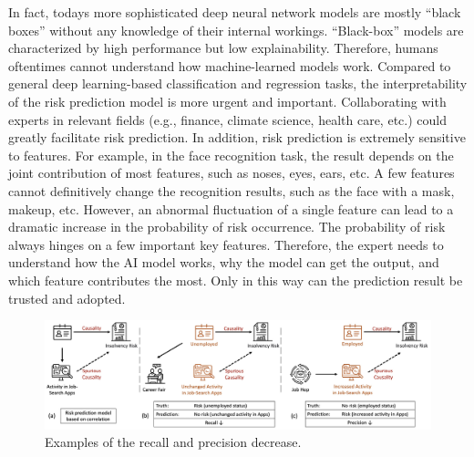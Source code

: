\documentclass[letterpaper]{article} %
\theoremstyle{definition}
\theoremstyle{remark}
\begin{document}
In fact, todays more sophisticated deep neural network models are mostly ``black boxes'' without any knowledge of their internal workings. ``Black-box'' models are characterized by high performance but low explainability. Therefore, humans oftentimes cannot understand how machine-learned models work. Compared to general deep learning-based classification and regression tasks, the interpretability of the risk prediction model is more urgent and important. Collaborating with experts in relevant fields (e.g., finance, climate science, health care, etc.) could greatly facilitate risk prediction. In addition, risk prediction is extremely sensitive to features. For example, in the face recognition task, the result depends on the joint contribution of most features, such as noses, eyes, ears, etc. A few features cannot definitively change the recognition results, such as the face with a mask, makeup, etc. However, an abnormal fluctuation of a single feature can lead to a dramatic increase in the probability of risk occurrence. The probability of risk always hinges on a few important key features. Therefore, the expert needs to understand how the AI model works, why the model can get the output, and which feature contributes the most. Only in this way can the prediction result be trusted and adopted.
\begin{figure}
\centering
\includegraphics[width=0.95\linewidth]{causal_correlation.jpg}

\caption{Examples of the recall and precision decrease.}

\label{fig:correlation}
\end{figure}
\end{document}
